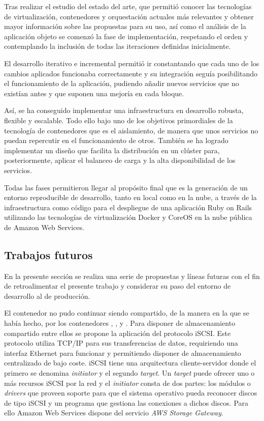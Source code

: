 Tras realizar el estudio del estado del arte, que permitió conocer las tecnologías de virtualización, contenedores y orquestación actuales más relevantes y obtener mayor información sobre las propuestas para su uso, así como el análisis de la aplicación objeto se comenzó la fase de implementación, respetando el orden y contemplando la inclusión de todas las iteraciones definidas inicialmente. 

El desarrollo iterativo e incremental permitió ir constantando que cada uno de los cambios aplicados funcionaba correctamente y su integración seguía posibilitando el funcionamiento de la aplicación, pudiendo añadir nuevos servicios que no existían antes y que suponen una mejoría en cada bloque.

Así, se ha conseguido implementar una infraestructura en desarrollo robusta, flexible y escalable. Todo ello bajo uno de los objetivos primordiales de la tecnología de contenedores que es el aislamiento, de manera que unos servicios no puedan repercutir en el funcionamiento de otros. También se ha logrado implementar un diseño que facilita la distribución en un clúster para, posteriormente, aplicar el balanceo de carga y la alta disponibilidad de los servicios.

Todas las fases permitieron llegar al propósito final que es la generación de un entorno reproducible de desarrollo, tanto en local como en la nube, a través de la infraestructura como código para el despliegue de una aplicación Ruby on Rails utilizando las tecnologías de virtualización Docker y CoreOS en la nube pública de Amazon Web Services.

\subsection{Trabajos futuros} \label{trabajosfuturos}

En la presente sección se realiza una serie de propuestas y líneas futuras con el fin de retroalimentar el presente trabajo y considerar su paso del entorno de desarrollo al de producción.

El contenedor  no pudo continuar siendo compartido, de la manera en la que se había hecho, por los contenedores , ,  y . Para disponer de almacenamiento compartido entre ellos se propone la aplicación del protocolo iSCSI. Este protocolo utiliza TCP/IP para sus transferencias de datos, requiriendo una interfaz Ethernet para funcionar y permitiendo disponer de almacenamiento centralizado de bajo coste. iSCSI tiene una arquitectura cliente-servidor donde el primero se denomina \textit{initiator} y el segundo \textit{target}. Un \textit{target} puede ofrecer uno o más recursos iSCSI por la red y el \textit{initiator} consta de dos partes: los módulos o \textit{drivers} que proveen soporte para que el sistema operativo pueda reconocer discos de tipo iSCSI y un programa que gestiona las conexiones a dichos discos. Para ello Amazon Web Services dispone del servicio \textit{AWS Storage Gateway}.

